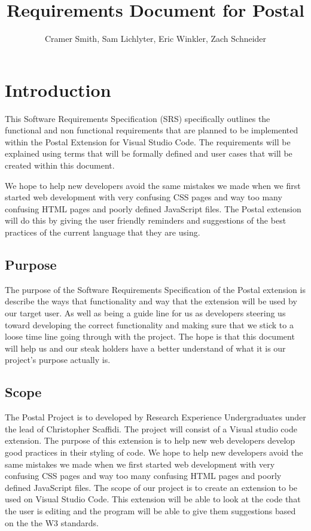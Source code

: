 \documentclass[letterpaper,10pt,titlepage,draftclsnofoot,onecolumn,onesided] {IEEEtran}
\begin{document}

\title{\Huge{\bfseries{\textsf{Requirements Document for Postal}}}}
\author{Cramer Smith, Sam Lichlyter, Eric Winkler, Zach Schneider}

\maketitle

\pagebreak

\tableofcontents

\pagebreak

\section{Introduction}

This Software Requirements Specification (SRS) specifically outlines the functional and non functional requirements that are planned to be implemented within the Postal Extension for Visual Studio Code. 
The requirements will be explained using terms that will be formally defined and user cases that will be created within this document. 

We hope to help new developers avoid the same mistakes we made when we first started web development with very confusing CSS pages and way too many confusing HTML pages and poorly defined JavaScript files. 
The Postal extension will do this by giving the user friendly reminders and suggestions of the best practices of the current language that they are using.

\subsection{Purpose}
The purpose of the Software Requirements Specification of the Postal extension is describe the ways that functionality and way that the extension will be used by our target user. 
As well as being a guide line for us as developers steering us toward developing the correct functionality and making sure that we stick to a loose time line going through with the project.
The hope is that this document will help us and our steak holders have a better understand of what it is our project's purpose actually is.

\subsection{Scope}
The Postal Project is to developed by Research Experience Undergraduates under the lead of Christopher Scaffidi. 
The project will consist of a Visual studio code extension.
The purpose of this extension is to help new web developers develop good practices in their styling of code.
We hope to help new developers avoid the same mistakes we made when we first started web development with very confusing CSS pages and way too many confusing HTML pages and poorly defined JavaScript files.
The scope of our project is to create an extension to be used on Visual Studio Code. 
This extension will be able to look at the code that the user is editing and the program will be able to give them suggestions based on the the W3 standards. 
\end{document}
